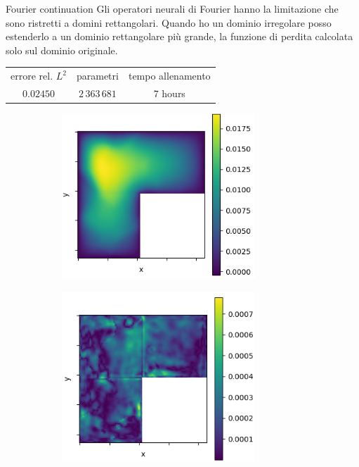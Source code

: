 \documentclass{beamer}
\begin{document}
\begin{frame}{Fourier continuation}
	Gli operatori neurali di Fourier hanno la limitazione che sono ristretti a domini rettangolari. Quando ho un dominio irregolare posso estenderlo a un dominio rettangolare più grande, la funzione di perdita calcolata solo sul dominio originale.
	\begin{table}[h!] %
		\centering
		\begin{tabular}{ccc}\toprule
		errore rel. $ L^2 $ & parametri & tempo allenamento \\
			\cmidrule{1-3}
			$ 0.02450 $ & $ 2\, 363\, 681 $ & $ 7 $ hours\\
			\bottomrule
		\end{tabular}
	\end{table}
	\begin{figure}
		\centering
		\begin{subfigure}{0.45\textwidth}
			\centering
			\includegraphics[width=0.8\textwidth]{SoluzioneContinuationL.png}
		\end{subfigure}
		\hfill
		\begin{subfigure}{0.45\textwidth}
			\centering
			\includegraphics[width=0.8\textwidth]{DifferenzaContinuationL.png}
		\end{subfigure}
	\end{figure}
\end{frame}
\end{document}

